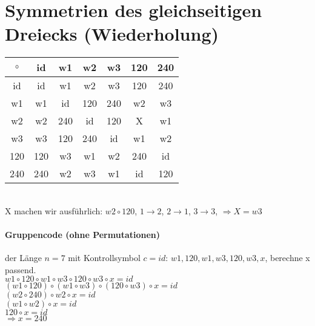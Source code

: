 \renewcommand{\ldate}{2015-05-28}	%

\section{Symmetrien des gleichseitigen Dreiecks (Wiederholung)}




\begin{tabular}{|c|c|c|c|c|c|c|}
\hline $\circ$ & id & w1 & w2 & w3 & 120 & 240 \\ 
\hline id & id & w1 & w2 & w3 & 120 & 240 \\ 
\hline w1 & w1 & id & 120 & 240 & w2 & w3 \\ 
\hline w2 & w2 & 240 & id & 120 & X & w1 \\ 
\hline w3 & w3 & 120 & 240 & id & w1 & w2 \\ 
\hline 120 & 120 & w3 & w1 & w2 & 240 & id \\ 
\hline 240 & 240 & w2 & w3 & w1 & id & 120 \\ 
\hline 
\end{tabular} \\
X machen wir ausführlich: $w2 \circ 120$, $ 1 \rightarrow 2 $, $ 2 \rightarrow 1 $, $ 3 \rightarrow 3 $, $ \Rightarrow X = w3 $

\paragraph{Gruppencode (ohne Permutationen)}der Länge $n=7$ mit Kontrollsymbol $c=id$: $w1, 120, w1, w3, 120, w3, x$, berechne x passend.\\
$w1 \circ 120 \circ w1 \circ w3 \circ 120 \circ w3 \circ x = id$\\
$(w1 \circ 120) \circ (w1 \circ w3) \circ (120 \circ w3) \circ x = id$\\
$(w2 \circ 240) \circ w2 \circ x = id$ \\
$(w1 \circ w2) \circ x = id$\\
$120 \circ x = id$\\
$\Rightarrow x=240$

